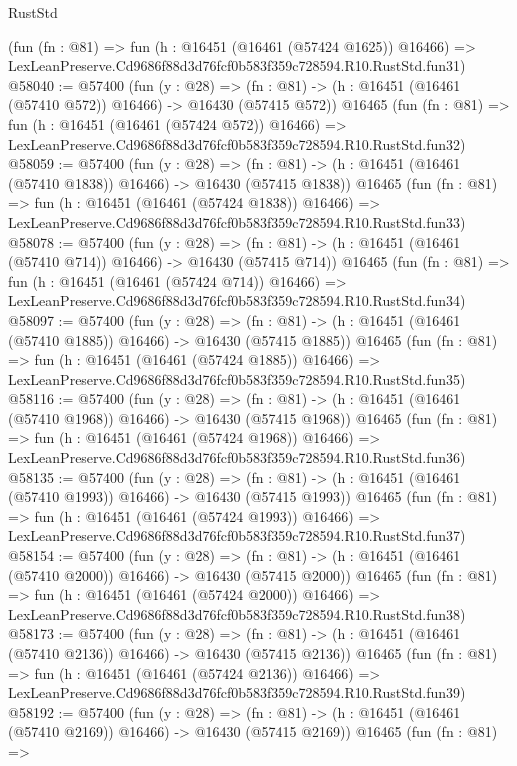 \begin{lexlean}{RustStd}
\begin{coremodule}
    (fun (fn : @81) =>
    fun (h : @16451 (@16461 (@57424 @1625)) @16466) =>
    LexLeanPreserve.Cd9686f88d3d76fcf0b583f359c728594.R10.RustStd.fun31)
@58040 := @57400
    (fun (y : @28) =>
    (fn : @81) -> (h : @16451 (@16461 (@57410 @572)) @16466) -> @16430 (@57415 @572))
    @16465
    (fun (fn : @81) =>
    fun (h : @16451 (@16461 (@57424 @572)) @16466) =>
    LexLeanPreserve.Cd9686f88d3d76fcf0b583f359c728594.R10.RustStd.fun32)
@58059 := @57400
    (fun (y : @28) =>
    (fn : @81) -> (h : @16451 (@16461 (@57410 @1838)) @16466) -> @16430 (@57415 @1838))
    @16465
    (fun (fn : @81) =>
    fun (h : @16451 (@16461 (@57424 @1838)) @16466) =>
    LexLeanPreserve.Cd9686f88d3d76fcf0b583f359c728594.R10.RustStd.fun33)
@58078 := @57400
    (fun (y : @28) =>
    (fn : @81) -> (h : @16451 (@16461 (@57410 @714)) @16466) -> @16430 (@57415 @714))
    @16465
    (fun (fn : @81) =>
    fun (h : @16451 (@16461 (@57424 @714)) @16466) =>
    LexLeanPreserve.Cd9686f88d3d76fcf0b583f359c728594.R10.RustStd.fun34)
@58097 := @57400
    (fun (y : @28) =>
    (fn : @81) -> (h : @16451 (@16461 (@57410 @1885)) @16466) -> @16430 (@57415 @1885))
    @16465
    (fun (fn : @81) =>
    fun (h : @16451 (@16461 (@57424 @1885)) @16466) =>
    LexLeanPreserve.Cd9686f88d3d76fcf0b583f359c728594.R10.RustStd.fun35)
@58116 := @57400
    (fun (y : @28) =>
    (fn : @81) -> (h : @16451 (@16461 (@57410 @1968)) @16466) -> @16430 (@57415 @1968))
    @16465
    (fun (fn : @81) =>
    fun (h : @16451 (@16461 (@57424 @1968)) @16466) =>
    LexLeanPreserve.Cd9686f88d3d76fcf0b583f359c728594.R10.RustStd.fun36)
@58135 := @57400
    (fun (y : @28) =>
    (fn : @81) -> (h : @16451 (@16461 (@57410 @1993)) @16466) -> @16430 (@57415 @1993))
    @16465
    (fun (fn : @81) =>
    fun (h : @16451 (@16461 (@57424 @1993)) @16466) =>
    LexLeanPreserve.Cd9686f88d3d76fcf0b583f359c728594.R10.RustStd.fun37)
@58154 := @57400
    (fun (y : @28) =>
    (fn : @81) -> (h : @16451 (@16461 (@57410 @2000)) @16466) -> @16430 (@57415 @2000))
    @16465
    (fun (fn : @81) =>
    fun (h : @16451 (@16461 (@57424 @2000)) @16466) =>
    LexLeanPreserve.Cd9686f88d3d76fcf0b583f359c728594.R10.RustStd.fun38)
@58173 := @57400
    (fun (y : @28) =>
    (fn : @81) -> (h : @16451 (@16461 (@57410 @2136)) @16466) -> @16430 (@57415 @2136))
    @16465
    (fun (fn : @81) =>
    fun (h : @16451 (@16461 (@57424 @2136)) @16466) =>
    LexLeanPreserve.Cd9686f88d3d76fcf0b583f359c728594.R10.RustStd.fun39)
@58192 := @57400
    (fun (y : @28) =>
    (fn : @81) -> (h : @16451 (@16461 (@57410 @2169)) @16466) -> @16430 (@57415 @2169))
    @16465
    (fun (fn : @81) =>

\end{coremodule}
\end{lexlean}

